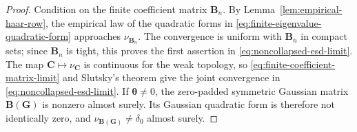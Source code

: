 \documentclass{article}
\newcommand{\bB}{\mathbf{B}}
\newcommand{\bC}{\mathbf{C}}
\newcommand{\bG}{\mathbf{G}}
\theoremstyle{definition}
\theoremstyle{remark}
\begin{document}
\begin{proof}
Condition on the finite coefficient matrix $\bB_n$.  By
Lemma~\ref{lem:empirical-haar-row}, the empirical law of the quadratic forms in
\eqref{eq:finite-eigenvalue-quadratic-form} approaches $\nu_{\bB_n}$.  The
convergence is uniform with $\bB_n$ in compact sets; since $\bB_n$ is tight,
this proves the first assertion in \eqref{eq:noncollapsed-esd-limit}.  The map
$\bC\mapsto\nu_{\bC}$ is continuous for the weak topology, so
\eqref{eq:finite-coefficient-matrix-limit} and Slutsky's theorem give the joint
convergence in \eqref{eq:noncollapsed-esd-limit}.  If
$\boldsymbol{\theta}\neq0$, the zero-padded symmetric Gaussian matrix
$\bB(\bG)$ is nonzero almost surely.  Its Gaussian quadratic form is therefore
not identically zero, and $\nu_{\bB(\bG)}\neq\delta_0$ almost surely.
\end{proof}
\end{document}
